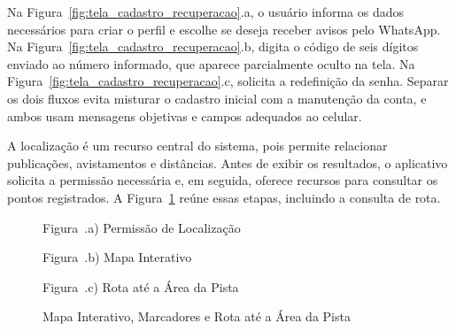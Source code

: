 Na Figura~\ref{fig:tela_cadastro_recuperacao}.a, o usuário informa os dados necessários para criar o perfil e escolhe se deseja receber avisos pelo WhatsApp. Na Figura~\ref{fig:tela_cadastro_recuperacao}.b, digita o código de seis dígitos enviado ao número informado, que aparece parcialmente oculto na tela. Na Figura~\ref{fig:tela_cadastro_recuperacao}.c, solicita a redefinição da senha. Separar os dois fluxos evita misturar o cadastro inicial com a manutenção da conta, e ambos usam mensagens objetivas e campos adequados ao celular.

A localização é um recurso central do sistema, pois permite relacionar publicações, avistamentos e distâncias. Antes de exibir os resultados, o aplicativo solicita a permissão necessária e, em seguida, oferece recursos para consultar os pontos registrados. A Figura~\ref{fig:tela_mapa} reúne essas etapas, incluindo a consulta de rota.

\begin{figure}[H]
    \centering
    \caption{Mapa Interativo, Marcadores e Rota até a Área da Pista}
    \label{fig:tela_mapa}
    \vspace{0.15cm}
    \begin{minipage}[t]{0.31\textwidth}
        \centering
        \par\vspace{0.12cm}
        {\small Figura~\thefigure.a) Permissão de Localização}
    \end{minipage}
    \hfill
    \begin{minipage}[t]{0.31\textwidth}
        \centering
        \par\vspace{0.12cm}
        {\small Figura~\thefigure.b) Mapa Interativo}
    \end{minipage}
    \hfill
    \begin{minipage}[t]{0.31\textwidth}
        \centering
        \par\vspace{0.12cm}
        {\small Figura~\thefigure.c) Rota até a Área da Pista}
    \end{minipage}
    \par\vspace{0.12cm}
\end{figure}

